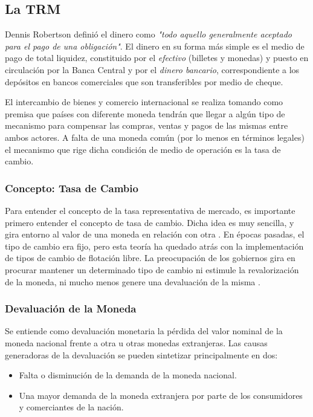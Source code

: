 \subsection{La TRM}
Dennis Robertson \cite{robertson} definió el dinero como \textit{"todo aquello generalmente aceptado para el pago de una obligación"}. El dinero en su forma más simple es el medio de pago de total liquidez, constituido por el \textit{efectivo} (billetes y monedas) y puesto en circulación por la Banca Central y por el \textit{dinero bancario}, correspondiente a los depósitos en bancos comerciales que son transferibles por medio de cheque.

El intercambio de bienes y comercio internacional se realiza tomando como premisa que países con diferente moneda tendrán que llegar a algún tipo de mecanismo para compensar las compras, ventas y pagos de las mismas entre ambos actores. A falta de una moneda común (por lo menos en términos legales) el mecanismo que rige dicha condición de medio de operación es la tasa de cambio.

\subsubsection{Concepto: Tasa de Cambio}
Para entender el concepto de la tasa representativa de mercado, es importante primero entender el concepto de tasa de cambio. Dicha idea es muy sencilla, y gira entorno al valor de una moneda en relación con otra \cite{30seconds}. En épocas pasadas, el tipo de cambio era fijo, pero esta teoría ha quedado atrás con la implementación de tipos de cambio de flotación libre. La preocupación de los gobiernos gira en procurar mantener un determinado tipo de cambio ni estimule la revalorización de la moneda, ni mucho menos genere una devaluación de la misma \cite{cardenas}.

\subsubsection{Devaluación de la Moneda}
Se entiende como devaluación monetaria la pérdida del valor nominal de la moneda nacional frente a otra u otras monedas extranjeras. Las causas generadoras de la devaluación se pueden sintetizar principalmente en dos:

\begin{itemize}
	\item Falta o disminución de la demanda de la moneda nacional.
	\item Una mayor demanda de la moneda extranjera por parte de los consumidores y comerciantes de la nación.
\end{itemize}

